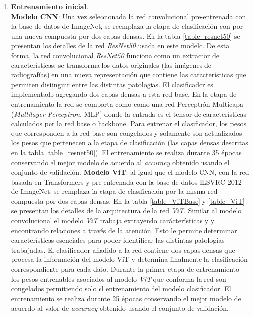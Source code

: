 {%
\begin{enumerate}
    \item \textbf{Entrenamiento inicial}.\\
          \textbf{Modelo CNN}: Una vez seleccionada la red convolucional pre-entrenada
          con la base de datos de ImageNet, se reemplaza la etapa de clasificación con por una nueva
          compuesta por dos capas densas. En la tabla \ref{table_resnet50} se presentan los detalles
          de la red \textit{ResNet50} usada en este modelo. De esta forma, la red convolucional
          \textit{ResNet50} funciona como un extractor de características; se transforma los datos
          originales (las imágenes de radiografías) en una nueva representación que contiene las
          características que permiten distinguir entre las distintas patologías. El clasificador es
          implementado agregando dos capas densas a esta red base. En la etapa de entrenamiento la
          red se comporta como como una red Perceptrón Multicapa (\textit{Multilayer Perceptron},
          MLP) donde la entrada es el tensor de características calculados por la red base o
          backbone. Para entrenar el clasificador, los pesos que corresponden a la red base son
          congelados y solamente son actualizados los pesos que pertenecen a la etapa de
          clasificación (las capas densas descritas en la tabla \ref{table_resnet50}). El
          entrenamiento se realiza durante 35 épocas conservando el mejor modelo de acuerdo al
          \textit{accuracy} obtenido usando el conjunto de validación.
          \textbf{Modelo ViT}: al igual que el modelo CNN, con la red basada en Transformers y pre-entrenada con la base de datos
          ILSVRC-2012 de ImageNet, se remplaza la etapa de clasificación
          por la misma red compuesta por dos capas densas. En la tabla \ref{table_ViTBase}
          y \ref{table_ViT} se presentan los detalles de la arquitectura de la red \textit{ViT}.
          Similar al modelo convolucional el modelo \textit{ViT} trabaja extrayendo carácterísticas y
          y encontrando relaciones a través de la atención. Esto le permite determinar características
          esenciales para poder identificar las distintas patologías trabajadas. El clasificador
          añadido a la red contiene dos capas densas que procesa la información del modelo ViT y
          determina finalmente la clasificación correspondiente para cada dato. Durante la primer
          etapa de entrenamiento los pesos entrenables asociados al modelo \textit{ViT} que conforma
          la red son congelados permitiendo solo el entrenamiento del modelo clasificador. El entrenamiento
          se realiza durante 25 épocas conservando el mejor modelo de acuerdo al valor de \textit{accuracy}
          obtenido usando el conjunto de validación.


\end{enumerate}}
